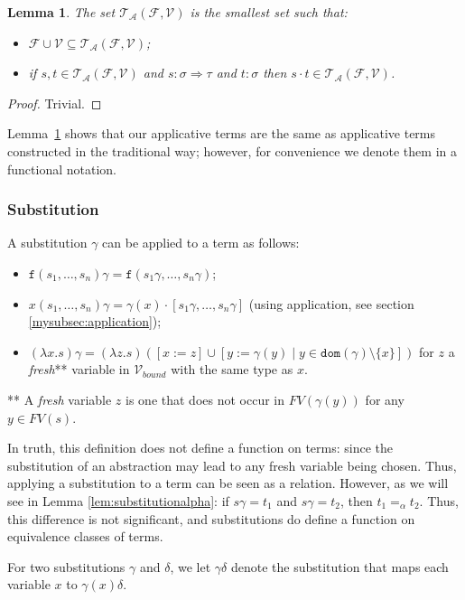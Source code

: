 \documentclass{lmcs}
\theoremstyle{theorem}\newtheorem{theorem}{Theorem}
\theoremstyle{theorem}\newtheorem{lemma}[theorem]{Lemma}
\theoremstyle{theorem}\newtheorem{corollary}[theorem]{Corollary}
\theoremstyle{definition}\newtheorem{definition}[theorem]{Definition}
\theoremstyle{definition}\newtheorem{example}[theorem]{Example}
\newcommand{\F}{\mathcal{F}}
\newcommand{\V}{\mathcal{V}}
\newcommand{\Vbound}{\mathcal{V}_{\mathit{bound}}}
\newcommand{\ATerms}{\mathcal{T}_{\mathcal{A}}}
\newcommand{\FV}{\mathit{FV}}
\newcommand{\domain}{\mathtt{dom}}
\newcommand{\atype}{\sigma}
\newcommand{\btype}{\tau}
\newcommand{\identifier}[1]{\mathtt{#1}}
\newcommand{\afun}{\identifier{f}}
\newcommand{\avar}{x}
\newcommand{\bvar}{y}
\newcommand{\cvar}{z}
\newcommand{\abs}[2]{\lambda #1.#2}
\newcommand{\arrtype}{\Rightarrow}
\newcommand{\mysubsection}[1]{\vspace{-12pt}\subsubsection{#1}}
\begin{document}
\begin{lemma}\label{lem:applicative_notation}
The set $\ATerms(\F,\V)$ is the smallest set such that:
\begin{itemize}
\item $\F \cup \V \subseteq \ATerms(\F,\V)$;
\item if $s,t \in \ATerms(\F,\V)$ and $s : \atype \arrtype \btype$ and $t : \atype$ then
  $s \cdot t \in \ATerms(\F,\V)$.
\end{itemize}
\end{lemma}

\begin{proof}
Trivial.
\end{proof}

Lemma~\ref{lem:applicative_notation} shows that our applicative terms are the same as applicative
terms constructed in the traditional way; however, for convenience we denote them in a functional
notation.

\mysubsection{Substitution}\label{mysubsec:substitution}
A substitution $\gamma$ can be applied to a term as follows:
\begin{itemize}
\item $\afun(s_1,\dots,s_n)\gamma = \afun(s_1\gamma,\dots,s_n\gamma)$;
\item $\avar(s_1,\dots,s_n)\gamma = \gamma(\avar) \cdot [s_1\gamma,\dots,s_n\gamma]$
  (using application, see section \ref{mysubsec:application});
\item $(\abs{\avar}{s})\gamma = (\abs{\cvar}{s}) ([\avar:=\cvar] \cup [\bvar := \gamma(\bvar) \mid
  \bvar \in \domain(\gamma) \setminus \{\avar\}])$ for $\cvar$ a \emph{fresh}** variable in
  $\Vbound$ with the same type as $\avar$.
\end{itemize}
** A \emph{fresh} variable $\cvar$ is one that does not occur in $\FV(\gamma(\bvar))$ for any
$\bvar \in \FV(s)$.

In truth, this definition does not define a function on terms: since the substitution of an
abstraction may lead to any fresh variable being chosen.  Thus, applying a substitution to a term
can be seen as a relation.  However, as we will see in Lemma \ref{lem:substitutionalpha}: if
$s\gamma = t_1$ and $s\gamma = t_2$, then $t_1 =_\alpha t_2$.  Thus, this difference is not
significant, and substitutions do define a function on equivalence classes of terms.

For two substitutions $\gamma$ and $\delta$, we let $\gamma\delta$ denote the substitution that
maps each variable $x$ to $\gamma(x)\delta$.
\end{document}

